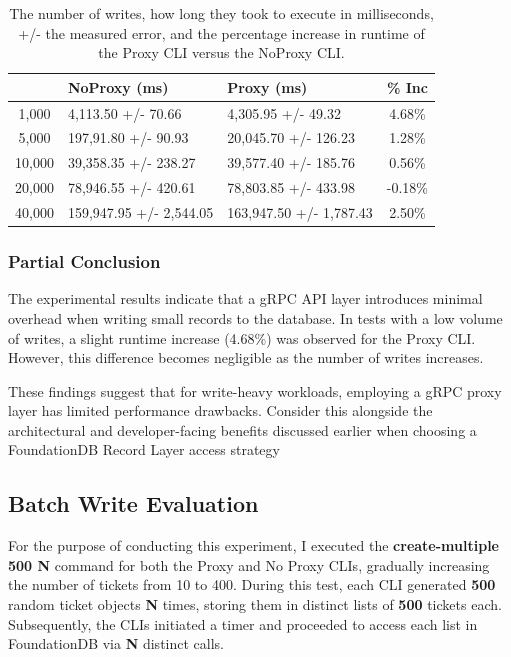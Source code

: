 \documentclass[sigconf]{acmart}
\begin{document}
\begin{table}[h]
\begin{tabular}{|c|l|l|c|}
    \hline
    \rowcolor[HTML]{656565} 
    \multicolumn{1}{|c}{\cellcolor[HTML]{656565}{\color[HTML]{FFFFFF} \textbf{N}}} &
    {\color[HTML]{FFFFFF} \textbf{NoProxy (ms)}} &
    {\color[HTML]{FFFFFF} \textbf{Proxy (ms)}} &
    {\color[HTML]{FFFFFF} \textbf{\% Inc}} \\ \hline
    1,000  & 4,113.50 +/- 70.66      & 4,305.95 +/- 49.32      & 4.68\%  \\
    \rowcolor[HTML]{EFEFEF} 
    5,000  & 197,91.80 +/- 90.93     & 20,045.70 +/- 126.23    & 1.28\%  \\
    10,000 & 39,358.35 +/- 238.27    & 39,577.40 +/- 185.76    & 0.56\%  \\
    \rowcolor[HTML]{EFEFEF} 
    20,000 & 78,946.55 +/- 420.61    & 78,803.85 +/- 433.98    & -0.18\% \\
    40,000 & 159,947.95 +/- 2,544.05 & 163,947.50 +/- 1,787.43 & 2.50\%  \\ \hline
\end{tabular}
\caption{The number of writes, how long they took to execute in milliseconds, +/- the measured error, and the percentage increase in runtime of the Proxy CLI versus the NoProxy CLI.}
\end{table}

\subsubsection{Partial Conclusion}

The experimental results indicate that a gRPC API layer introduces minimal overhead when writing small records to the database. In tests with a low volume of writes, a slight runtime increase (4.68\%) was observed for the Proxy CLI. However, this difference becomes negligible as the number of writes increases.

These findings suggest that for write-heavy workloads, employing a gRPC proxy layer has limited performance drawbacks. Consider this alongside the architectural and developer-facing benefits discussed earlier when choosing a FoundationDB Record Layer access strategy

\subsection{Batch Write Evaluation}

For the purpose of conducting this experiment, I executed the \textbf{create-multiple 500 N} command for both the Proxy and No Proxy CLIs, gradually increasing the number of tickets from 10 to 400. During this test, each CLI generated \textbf{500} random ticket objects \textbf{N} times, storing them in distinct lists of \textbf{500} tickets each. Subsequently, the CLIs initiated a timer and proceeded to access each list in FoundationDB via \textbf{N} distinct calls.
\end{document}

